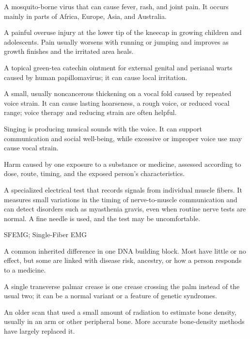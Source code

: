  A mosquito-borne virus that can cause fever, rash, and joint pain. It occurs mainly in parts of Africa, Europe, Asia, and Australia.

 A painful overuse injury at the lower tip of the kneecap in growing children and adolescents. Pain usually worsens with running or jumping and improves as growth finishes and the irritated area heals.

 A topical green-tea catechin ointment for external genital and perianal warts caused by human papillomavirus; it can cause local irritation.

 A small, usually noncancerous thickening on a vocal fold caused by repeated voice strain. It can cause lasting hoarseness, a rough voice, or reduced vocal range; voice therapy and reducing strain are often helpful.

 Singing is producing musical sounds with the voice. It can support communication and social well-being, while excessive or improper voice use may cause vocal strain.

 Harm caused by one exposure to a substance or medicine, assessed according to dose, route, timing,
and the exposed person's characteristics.

 A specialized electrical test that records signals from individual muscle fibers. It measures small variations in the timing of nerve-to-muscle communication and can detect disorders such as myasthenia gravis, even when routine nerve tests are normal. A fine needle is used, and the test may be uncomfortable.

\synonyms
SFEMG; Single-Fiber EMG

 A common inherited difference in one DNA building block. Most have little or no effect, but some are linked with disease risk, ancestry, or how a person responds to a medicine.

 A single transverse palmar crease is one crease crossing the palm instead of the usual two; it can be a normal variant or a feature of genetic syndromes.

 An older scan that used a small amount of radiation to estimate bone density, usually in an arm or other peripheral bone. More accurate bone-density methods have largely replaced it.

